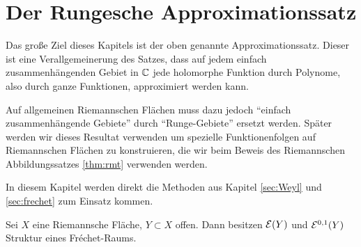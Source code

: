 
\section{Der Rungesche Approximationssatz}
\label{sec:Runge}

Das große Ziel dieses Kapitels ist der oben genannte
Approximationssatz. Dieser ist eine Verallgemeinerung des Satzes, dass
auf jedem einfach zusammenhängenden Gebiet in $\mathbb{C}$ jede holomorphe
Funktion durch Polynome, also durch ganze Funktionen, approximiert
werden kann.

Auf allgemeinen Riemannschen Flächen muss dazu jedoch "`einfach
zusammenhängende Gebiete"' durch "`Runge-Gebiete"' ersetzt
werden. Später werden wir dieses Resultat verwenden um spezielle
Funktionenfolgen auf Riemannschen Flächen zu konstruieren, die wir
beim Beweis des Riemannschen Abbildungssatzes \ref{thm:rmt} verwenden
werden.

In diesem Kapitel werden direkt die Methoden aus Kapitel
\ref{sec:Weyl} und \ref{sec:frechet} zum Einsatz kommen.

\begin{prop}
  \label{prop:diff-frechet}
  Sei $X$ eine Riemannsche Fläche, $Y \subset X$ offen. 
  Dann besitzen $\mathcal{E}(Y)$ und $\mathcal{E}^{0,1}(Y)$ Struktur eines Fr\'echet-Raums.
\end{prop}

